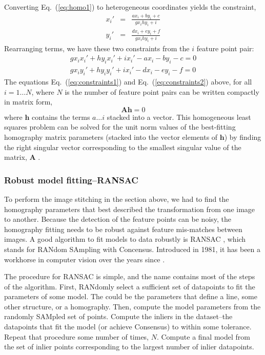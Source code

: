 Converting Eq.~(\ref{eq:homo1}) to heterogeneous coordinates yields the constraint,
\begin{eqnarray}
        x_i' & = & \frac{a x_i + b y_i + c}{g x_i h y_i + i} \\
        y_i' & = & \frac{d x_i + e y_i + f}{g x_i h y_i + i} 
\end{eqnarray}
Rearranging terms, we have these two constraints from the $i$ feature point pair:
\begin{eqnarray}
        g x_i x_i' +  h y_i x_i' + i x_i' -a x_i - b y_i - c  = 0 \\
           \label{eq:constraints1}
        g x_i y_i' +  h y_i y_i' + i x_i' -d x_i - e y_i - f = 0
        \label{eq:constraints2}
\end{eqnarray}
The equations Eq.~(\ref{eq:constraints1}) and Eq.~(\ref{eq:constraints2}) above, for all $i = 1 \ldots N$, where $N$ is the number of feature point pairs can be written compactly in matrix form,
\begin{equation}
    \mathbf{A} \mathbf{h} = 0
    \label{eq:homogeneous}
\end{equation}
where $\mathbf{h}$ contains the terms $a \ldots i$ stacked into a vector.  This homogeneous least squares problem can be solved for the unit norm values of the best-fitting homography matrix parameters (stacked into the vector elements of $\mathbf{h}$) by finding the right singular vector corresponding to the smallest singular value of the matrix, $\mathbf{A}$ \cite{Forsyth2012}.

\subsubsection{Robust model fitting--RANSAC}
To perform the image stitching in the section above, we had to find the homography parameters that best described the transformation from one image to another. Because the detection of the feature points can be noisy, the homography fitting needs to be robust against feature mis-matches between images.  A good algorithm to fit models to data robustly is  RANSAC \cite{Fischler1981}, which stands for RANdom SAmpling with Concensus.  Introduced in 1981, it has been a workhorse in computer vision over the years since \cite{Zisserman2006}.

The procedure for RANSAC is simple, and the name contains most of the steps of the algorithm.  First, RANdomly select a sufficient set of datapoints to fit the parameters of some model.  The could be the parameters that define a line, some other structure, or a homography.  Then, compute the model parameters from the randomly SAMpled set of points. Compute the inliers in the dataset--the datapoints that fit the model (or achieve Consensus) to within some tolerance.  Repeat that procedure some number of times, $N$.    Compute a final model from the set of inlier points corresponding to the largest number of inlier datapoints.

